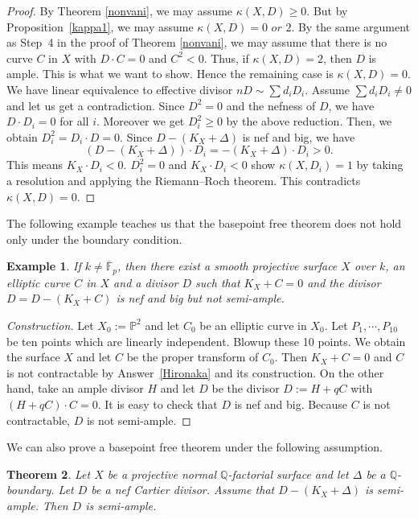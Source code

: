 \documentclass[12pt,twoside]{amsart}
\newtheorem{thm}{Theorem}[section]
\newtheorem{ex}[thm]{Example}
\theoremstyle{definition}
\newcommand{\Q}{$\mathbb{Q}$}
\newcommand{\fff}{\overline{\mathbb{F}}_p}
\begin{document}
\begin{proof}
By Theorem \ref{nonvani}, 
we may assume $\kappa(X, D) \geq 0$. 
But by Proposition~\ref{kappa1}, 
we may assume $\kappa(X, D)=0\,\,or\,\,2$. 
By the same argument as Step~4 in the proof of Theorem \ref{nonvani}, 
we may assume that there is no curve $C$ in $X$ 
with $D\cdot C=0$ and $C^2<0$. 
Thus, if $\kappa(X, D)=2$, then $D$ is ample. 
This is what we want to show. 
Hence the remaining case is $\kappa(X, D)=0$. 
We have linear equivalence to effective divisor $nD \sim \sum d_iD_i$. 
Assume $\sum d_iD_i \neq 0$ and let us get a contradiction. 
Since $D^2=0$ and the nefness of $D$, 
we have $D\cdot D_i=0$ for all $i$. 
Moreover we get $D_i^2 \geq 0$ by the above reduction. 
Then, we obtain $D_i^2=D_i\cdot D=0$.
Since $D-(K_X+\Delta)$ is nef and big, we have 
$$(D-(K_X+\Delta))\cdot D_i=-(K_X+\Delta)\cdot D_i > 0. $$ 
This means $K_X\cdot D_i<0$. 
$D_i^2=0$ and $K_X\cdot D_i<0$ show $\kappa(X, D_i)=1$ 
by taking a resolution and applying the Riemann--Roch theorem. 
This contradicts $\kappa(X, D)=0$.
\end{proof}

The following example teaches us that 
the basepoint free theorem does not hold only under the boundary condition. 


\begin{ex}
If $k\neq\fff$, then 
there exist a smooth projective surface $X$ over $k$, 
an elliptic curve $C$ in $X$ and a divisor $D$ 
such that $K_X+C=0$ and the divisor $D=D-(K_X+C)$ is nef and big but not semi-ample.
\end{ex}

\begin{proof}[Construction]
Let $X_0:=\mathbb{P}^2$ and 
let $C_0$ be an elliptic curve in $X_0$. 
Let $P_1,\cdots ,P_{10}$ be ten points which are linearly independent. 
Blowup these 10 points. 
We obtain the surface $X$ and 
let $C$ be the proper transform of $C_0$. 
Then $K_X+C=0$ and 
$C$ is not contractable by Answer~\ref{Hironaka} and its construction. 
On the other hand, take an ample divisor $H$ and 
let $D$ be the divisor $D:=H+qC$ with $(H+qC)\cdot C=0$. 
It is easy to check that $D$ is nef and big. 
Because $C$ is not contractable, $D$ is not semi-ample. 
\end{proof}



We can also prove a basepoint free theorem 
under the following assumption. 

\begin{thm}
Let $X$ be a projective normal \Q-factorial surface and 
let $\Delta$ be a $\mathbb{Q}$-boundary. 
Let $D$ be a nef Cartier divisor. 
Assume that $D-(K_X+\Delta)$ is semi-ample. 
Then $D$ is semi-ample. 
\end{thm}
\end{document}
